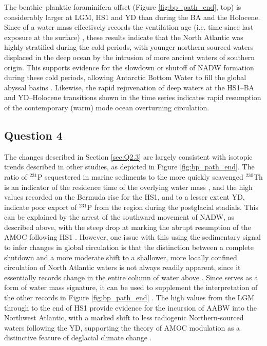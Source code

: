 The benthic--planktic foraminifera \fC{} offset (Figure \ref{fig:bp_path_end}, top) is considerably larger at LGM, HS1 and YD than during the BA and the Holocene.
Since \BP{} of a water mass effectively records the ventilation age (i.e. time since last exposure at the surface) \parencite{lynch2014tracers}, these results indicate that the North Atlantic was highly stratified during the cold periods, with younger northern sourced waters displaced in the deep ocean by the intrusion of more ancient waters of southern origin.
This supports evidence for the slowdown or shutoff of NADW formation during these cold periods, allowing Antarctic Bottom Water to fill the global abyssal basins \parencite{boyle1985comparison, bard1994north, thornalley2011deglacial}.
Likewise, the rapid rejuvenation of deep waters at the HS1--BA and YD--Holocene transitions shown in the \BP{} time series indicates rapid resumption of the contemporary (warm) mode ocean overturning circulation.

\subsection{Question 4}
\label{sec:Q2.4}
The \BP{} changes described in Section \ref{sec:Q2.3} are largely consistent with isotopic trends described in other studies, as depicted in Figure \ref{fig:bp_path_end}.
The ratio of $^{231}$P sequestered in marine sediments to the more quickly scavenged $^{230}$Th is an indicator of the residence time of the overlying water mass \parencite{lynch2014tracers}, and the high values recorded on the Bermuda rise for the HS1, and to a lesser extent YD, indicate poor export of $^{231}$P from the region during the postglacial stadials.
This can be explained by the arrest of the southward movement of NADW, as described above, with the steep \PaTh{} drop at  marking the abrupt resumption of the AMOC following HS1 \parencite{mcmanus2004collapse}.
However, one issue with this using the sedimentary \PaTh{} signal to infer changes in global circulation is that the distinction between a complete shutdown and a more moderate shift to a shallower, more locally confined circulation of North Atlantic waters is not always readily apparent, since it essentially records change in the entire column of water above \parencite{roberts2010synchronous}. 
Since \eNd{} serves as a form of water mass signature, it can be used to supplement the interpretation of the other records in Figure \ref{fig:bp_path_end} \parencite{lynch2014tracers}. 
The high values from the LGM through to the end of HS1 provide evidence for the incursion of AABW into the Northwest Atlantic, with a marked shift to less radiogenic Northern-sourced waters following the YD, supporting the theory of AMOC modulation as a distinctive feature of deglacial climate change \parencite{roberts2010synchronous}.

